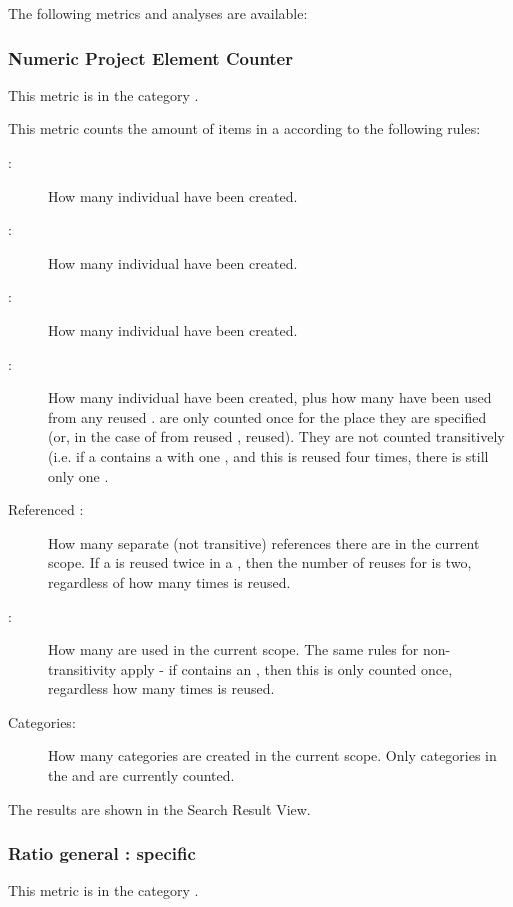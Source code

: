 The following metrics and analyses are available:

\subsubsection{Numeric Project Element Counter}
This metric is in the category .

This metric counts the amount of items in a \gdproject{} according to the following rules:

\begin{description}
\item [\gdcases{}:]{How many individual \gdcases{} have been created.}
\item [\gdsuites{}:]{How many individual \gdsuites{} have been created.}
\item[\gdjobs{}:]{How many individual \gdjobs{} have been created.}
\item[\gdsteps{}:]{How many individual \gdsteps{} have been created, plus how many \gdsteps{} have been used from any reused \gdprojects{}. \gdsteps{} are only counted once for the place they are specified (or, in the case of \gdsteps{} from reused \gdprojects{}, reused). They are not counted transitively (i.e. if a \gdproject{} contains a \gdcase{} with one \gdstep{}, and this \gdcase{} is reused four times, there is still only one \gdstep{}.}
\item[Referenced \gdcases{}:]{How many separate (not transitive) \gdcase{} references there are in the current scope. If a \gdcase{}  is reused twice in a \gdcase{} , then the number of reuses for  is two, regardless of how many times  is reused.}
\item[\gdehandlers{}:]{How many \gdehandlers{} are used in the current scope. The same rules for non-transitivity apply - if  contains an \gdehandler{}, then this \gdehandler{} is only counted once, regardless how many times  is reused.}
\item[Categories:]{How many categories are created in the current scope. Only categories in the \gdtestcasebrowser{} and \gdtestsuitebrowser{} are currently counted.} 
\end{description}

The results are shown in the Search Result View.

\subsubsection{Ratio general : specific}
This metric is in the category .

